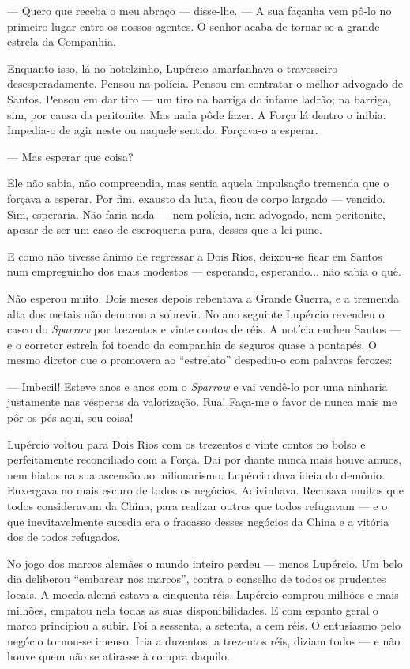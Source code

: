 --- Quero que receba o meu abraço --- disse-lhe. --- A sua façanha vem
pô-lo no primeiro lugar entre os nossos agentes. O senhor acaba de
tornar-se a grande estrela da Companhia.

Enquanto isso, lá no hotelzinho, Lupércio amarfanhava o travesseiro
desesperadamente. Pensou na polícia. Pensou em contratar o melhor
advogado de Santos. Pensou em dar tiro --- um tiro na barriga do infame
ladrão; na barriga, sim, por causa da peritonite. Mas nada pôde fazer. A
Força lá dentro o inibia. Impedia-o de agir neste ou naquele sentido.
Forçava-o a esperar.

--- Mas esperar que coisa?

Ele não sabia, não compreendia, mas sentia aquela impulsação tremenda
que o forçava a esperar. Por fim, exausto da luta, ficou de corpo
largado --- vencido. Sim, esperaria. Não faria nada --- nem polícia, nem
advogado, nem peritonite, apesar de ser um caso de escroqueria pura,
desses que a lei pune.

E como não tivesse ânimo de regressar a Dois Rios, deixou-se ficar em
Santos num empreguinho dos mais modestos --- esperando, esperando... não
sabia o quê.

Não esperou muito. Dois meses depois rebentava a Grande Guerra, e a
tremenda alta dos metais não demorou a sobrevir. No ano seguinte
Lupércio revendeu o casco do \emph{Sparrow} por trezentos e vinte contos
de réis. A notícia encheu Santos --- e o corretor estrela foi tocado da
companhia de seguros quase a pontapés. O mesmo diretor que o promovera
ao ``estrelato'' despediu-o com palavras ferozes:

--- Imbecil! Esteve anos e anos com o \emph{Sparrow} e vai vendê-lo por
uma ninharia justamente nas vésperas da valorização. Rua! Faça-me o
favor de nunca mais me pôr os pés aqui, seu coisa!

Lupércio voltou para Dois Rios com os trezentos e vinte contos no bolso
e perfeitamente reconciliado com a Força. Daí por diante nunca mais
houve amuos, nem hiatos na sua ascensão ao milionarismo. Lupércio dava
ideia do demônio. Enxergava no mais escuro de todos os negócios.
Adivinhava. Recusava muitos que todos consideravam da China, para
realizar outros que todos refugavam --- e o que inevitavelmente sucedia
era o fracasso desses negócios da China e a vitória dos de todos
refugados.

No jogo dos marcos alemães o mundo inteiro perdeu --- menos Lupércio. Um
belo dia deliberou ``embarcar nos marcos'', contra o conselho de todos
os prudentes locais. A moeda alemã estava a cinquenta réis. Lupércio
comprou milhões e mais milhões, empatou nela todas as suas
disponibilidades. E com espanto geral o marco principiou a subir. Foi a
sessenta, a setenta, a cem réis. O entusiasmo pelo negócio tornou-se
imenso. Iria a duzentos, a trezentos réis, diziam todos --- e não houve
quem não se atirasse à compra daquilo.

